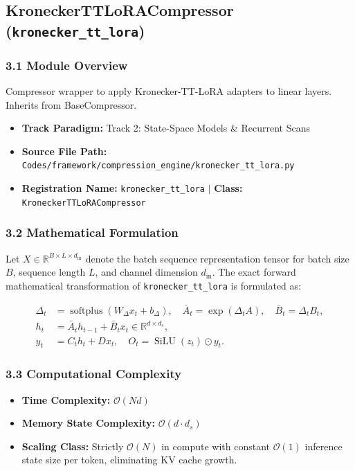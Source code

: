 \subsection{KroneckerTTLoRACompressor (\texttt{kronecker\_tt\_lora})}
\label{sec:app_module_kronecker_tt_lora}

\subsubsection*{3.1 Module Overview}
Compressor wrapper to apply Kronecker-TT-LoRA adapters to linear layers. Inherits from BaseCompressor.
\begin{itemize}
    \item \textbf{Track Paradigm:} Track 2: State-Space Models & Recurrent Scans
    \item \textbf{Source File Path:} \texttt{Codes/framework/compression\_engine/kronecker\_tt\_lora.py}
    \item \textbf{Registration Name:} \texttt{kronecker\_tt\_lora} $\mid$ \textbf{Class:} \texttt{KroneckerTTLoRACompressor}
\end{itemize}

\subsubsection*{3.2 Mathematical Formulation}
Let $X \in \mathbb{R}^{B \times L \times d_{\text{in}}}$ denote the batch sequence representation tensor for batch size $B$, sequence length $L$, and channel dimension $d_{\text{in}}$. The exact forward mathematical transformation of \texttt{kronecker\_tt\_lora} is formulated as:

\begin{align}
\Delta_t &= \operatorname{softplus}(W_\Delta x_t + b_\Delta), \quad \bar{A}_t = \exp(\Delta_t A), \quad \bar{B}_t = \Delta_t B_t, \\
h_t &= \bar{A}_t h_{t-1} + \bar{B}_t x_t \in \mathbb{R}^{d \times d_s}, \\
y_t &= C_t h_t + D x_t, \quad O_t = \operatorname{SiLU}(z_t) \odot y_t.
\end{align}


\subsubsection*{3.3 Computational Complexity}
\begin{itemize}
    \item \textbf{Time Complexity:} $\mathcal{O}(N d)$
    \item \textbf{Memory State Complexity:} $\mathcal{O}(d \cdot d_s)$
    \item \textbf{Scaling Class:} Strictly $\mathcal{O}(N)$ in compute with constant $\mathcal{O}(1)$ inference state size per token, eliminating KV cache growth.
\end{itemize}

